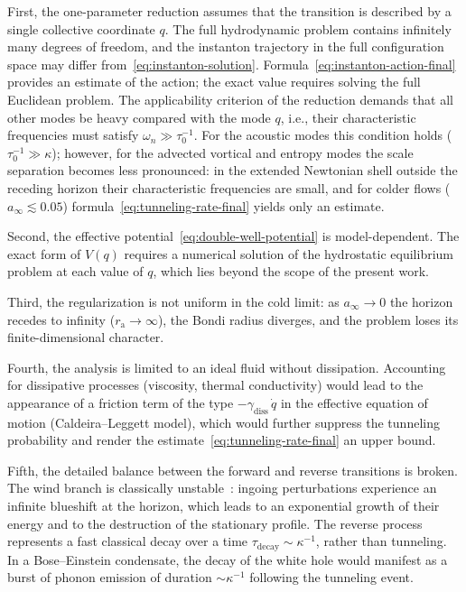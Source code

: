 \documentclass[12pt,a4paper,preprint]{elsarticle}
\begin{document}
            First, the one-parameter reduction assumes that the transition is described by a single collective coordinate $q$. The full hydrodynamic problem contains infinitely many degrees of freedom, and the instanton trajectory in the full configuration space may differ from~\eqref{eq:instanton-solution}. Formula~\eqref{eq:instanton-action-final} provides an estimate of the action; the exact value requires solving the full Euclidean problem. The applicability criterion of the reduction demands that all other modes be heavy compared with the mode $q$, i.e., their characteristic frequencies must satisfy $\omega_{n} \gg \tau_{0}^{-1}$. For the acoustic modes this condition holds ($\tau_{0}^{-1} \gg \kappa$); however, for the advected vortical and entropy modes the scale separation becomes less pronounced: in the extended Newtonian shell outside the receding horizon their characteristic frequencies are small, and for colder flows ($a_{\infty} \lesssim 0.05$) formula~\eqref{eq:tunneling-rate-final} yields only an estimate.
            
            Second, the effective potential~\eqref{eq:double-well-potential} is model-dependent. The exact form of $V(q)$ requires a numerical solution of the hydrostatic equilibrium problem at each value of $q$, which lies beyond the scope of the present work.
            
            Third, the regularization is not uniform in the cold limit: as $a_{\infty} \to 0$ the horizon recedes to infinity ($r_{\mathrm{a}} \to \infty$), the Bondi radius diverges, and the problem loses its finite-dimensional character.
            
            Fourth, the analysis is limited to an ideal fluid without dissipation. Accounting for dissipative processes (viscosity, thermal conductivity) would lead to the appearance of a friction term of the type $-\gamma_{\mathrm{diss}}\,\dot{q}$ in the effective equation of motion (Caldeira--Leggett model), which would further suppress the tunneling probability and render the estimate~\eqref{eq:tunneling-rate-final} an upper bound.
            
            Fifth, the detailed balance between the forward and reverse transitions is broken. The wind branch is classically unstable~\cite{SemyannikovAV_GlobalAcousticGeometryOfMichelFlowInPainleveGullstrandCoordinates_2026}: ingoing perturbations experience an infinite blueshift at the horizon, which leads to an exponential growth of their energy and to the destruction of the stationary profile. The reverse process represents a fast classical decay over a time $\tau_{\mathrm{decay}} \sim \kappa^{-1}$, rather than tunneling. In a Bose--Einstein condensate, the decay of the white hole would manifest as a burst of phonon emission of duration $\sim\kappa^{-1}$ following the tunneling event.
\end{document}
